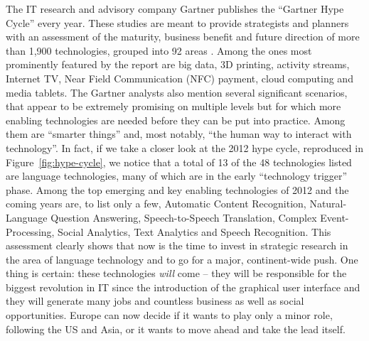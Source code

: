 \documentclass[10pt, plain]{../../metanetpaper}
\begin{document}
\begin{multicols}{2}
The IT research and advisory company Gartner publishes the ``Gartner Hype Cycle'' every year. These studies are meant to provide strategists and planners with an assessment of the maturity, business benefit and future direction of more than 1,900 technologies, grouped into 92 areas \cite{gartner2012}. Among the ones most prominently featured by the report are big data, 3D printing, activity streams, Internet TV, Near Field Communication (NFC) payment, cloud computing and media tablets. The Gartner analysts also mention several significant scenarios, that appear to be extremely promising on multiple levels but for which more enabling technologies are needed before they can be put into practice. Among them are  ``smarter things'' and, most notably, ``the human way to interact with technology''. In fact, if we take a closer look at the 2012 hype cycle, reproduced in Figure~\ref{fig:hype-cycle}, we notice that a total of 13 of the 48 technologies listed are language technologies, many of which are in the early ``technology trigger'' phase. Among the top emerging and key enabling technologies of 2012 and the coming years are, to list only a few, Automatic Content Recognition, Natural-Language Question Answering, Speech-to-Speech Translation, Complex Event-Processing, Social Analytics, Text Analytics and Speech Recognition. This assessment clearly shows that now is the time to invest in strategic research in the area of language technology and to go for a major, continent-wide push. One thing is certain: these technologies \emph{will} come -- they will be responsible for the biggest revolution in IT since the introduction of the graphical user interface and they will generate many jobs and countless business as well as social opportunities. Europe can now decide if it wants to play only a minor role, following the US and Asia, or it wants to move ahead and take the lead itself.
\end{multicols}

\clearpage


\label{sec:lwp}
\end{document}
